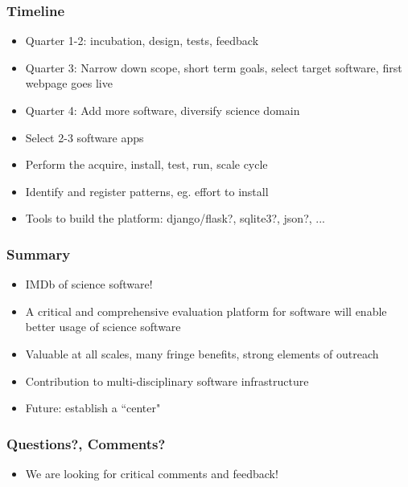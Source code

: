 \documentclass[hyperref={pdfpagelabels=false},12pt]{beamer}
\begin{document}
\begin{frame}
\frametitle{Timeline}
\begin{itemize}
\itemsep1em
\item 
Quarter 1-2: incubation, design, tests, feedback
\item
Quarter 3: Narrow down scope, short term goals, select target software, first webpage goes live
\item
Quarter 4: Add more software, diversify science domain
\item
Select 2-3 software apps
\item
Perform the acquire, install, test, run, scale cycle
\item
Identify and register patterns, eg. effort to install
\item
Tools to build the platform: django/flask?, sqlite3?, json?, ...
\end{itemize}
\end{frame}

\begin{frame}
\frametitle{Summary}
\begin{itemize}
\itemsep1em
\item IMDb of science software!
\item
A critical and comprehensive evaluation platform for software will enable better usage of science software
\item
Valuable at all scales, many fringe benefits, strong elements of outreach
\item
Contribution to multi-disciplinary software infrastructure
\item
Future: establish a ``center"
\end{itemize}
\end{frame}

\begin{frame}
\frametitle{Questions?, Comments?}
\begin{itemize}
\item We are looking for critical comments and feedback!
\end{itemize}
\end{frame}
\end{document}

